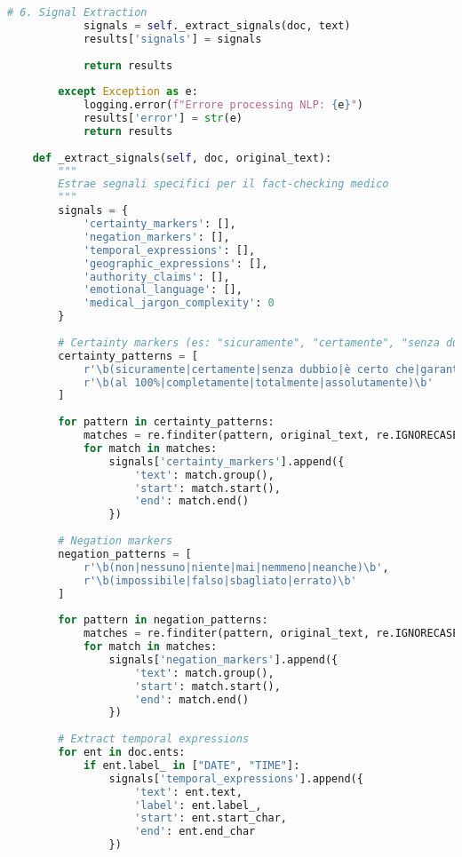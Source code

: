 \documentclass[12pt,a4paper]{report}
\begin{document}
\begin{lstlisting}[language=Python, caption=NLP Processing Pipeline]
            # 6. Signal Extraction
            signals = self._extract_signals(doc, text)
            results['signals'] = signals
            
            return results
            
        except Exception as e:
            logging.error(f"Errore processing NLP: {e}")
            results['error'] = str(e)
            return results
    
    def _extract_signals(self, doc, original_text):
        """
        Estrae segnali specifici per il fact-checking medico
        """
        signals = {
            'certainty_markers': [],
            'negation_markers': [],
            'temporal_expressions': [],
            'geographic_expressions': [],
            'authority_claims': [],
            'emotional_language': [],
            'medical_jargon_complexity': 0
        }
        
        # Certainty markers (es: "sicuramente", "certamente", "senza dubbio")
        certainty_patterns = [
            r'\b(sicuramente|certamente|senza dubbio|è certo che|garantito)\b',
            r'\b(al 100%|completamente|totalmente|assolutamente)\b'
        ]
        
        for pattern in certainty_patterns:
            matches = re.finditer(pattern, original_text, re.IGNORECASE)
            for match in matches:
                signals['certainty_markers'].append({
                    'text': match.group(),
                    'start': match.start(),
                    'end': match.end()
                })
        
        # Negation markers
        negation_patterns = [
            r'\b(non|nessuno|niente|mai|nemmeno|neanche)\b',
            r'\b(impossibile|falso|sbagliato|errato)\b'
        ]
        
        for pattern in negation_patterns:
            matches = re.finditer(pattern, original_text, re.IGNORECASE)
            for match in matches:
                signals['negation_markers'].append({
                    'text': match.group(),
                    'start': match.start(),
                    'end': match.end()
                })
        
        # Extract temporal expressions
        for ent in doc.ents:
            if ent.label_ in ["DATE", "TIME"]:
                signals['temporal_expressions'].append({
                    'text': ent.text,
                    'label': ent.label_,
                    'start': ent.start_char,
                    'end': ent.end_char
                })
        

\end{lstlisting}
\end{document}
